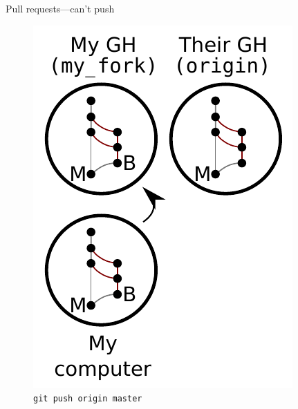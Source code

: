 \begin{frame}{Pull requests---can't push}
  \begin{figure}
    \includegraphics{fork_016.pdf}
    \\ \texttt{git push origin master}
    \\ \texttt{}
  \end{figure}
\end{frame}

